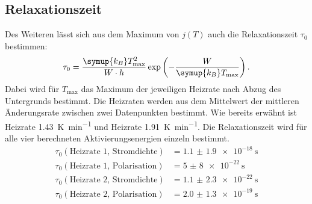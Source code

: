 \subsection{Relaxationszeit}
\label{sec:relax}
Des Weiteren lässt sich aus dem Maximum von $j(T)$ auch die Relaxationszeit $\tau_0$
bestimmen:
\begin{equation}
    \label{eqn:tau0}
    \tau_0 = \frac{\symup{k_B}T_\text{max}^2}{W \cdot h} \exp\left(-\frac{W}{\symup{k_B}T_\text{max}} \right).
\end{equation}
Dabei wird für $T_\text{max}$ das Maximum der jeweiligen Heizrate nach Abzug des Untergrunds bestimmt.
Die Heizraten werden aus dem Mittelwert der mittleren Änderungsrate zwischen zwei Datenpunkten bestimmt.
Wie bereits erwähnt ist Heizrate \SI{1.43}{\kelvin\per\minute} und Heizrate \SI{1.91}{\kelvin\per\minute}.
Die Relaxationszeit wird für alle vier berechneten Aktivierungsenergien einzeln bestimmt.
\begin{align*}
  \tau_0(\text{Heizrate 1, Stromdichte}) &= \SI{1.1(19)e-18}{\second} \\
  \tau_0(\text{Heizrate 1, Polarisation}) &= \SI{5(8)e-22}{\second} \\
  \tau_0(\text{Heizrate 2, Stromdichte}) &= \SI{1.1(23)e-22}{\second} \\
  \tau_0(\text{Heizrate 2, Polarisation}) &= \SI{2.0(13)e-19}{\second} \\
\end{align*}
